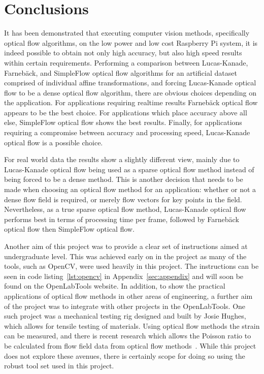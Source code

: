 \chapter{Conclusions}
\label{sec:conclusions}

\ifpdf
    \graphicspath{{Section5/Figs/Raster/}{Section5/Figs/PDF/}{Section5/Figs/}}
\else
    \graphicspath{{Section5/Figs/Vector/}{Section5/Figs/}}
\fi

It has been demonstrated that executing computer vision methods, specifically optical flow algorithms, on the low power and low cost Raspberry Pi system, it is indeed possible to obtain not only high accuracy, but also high speed results within certain requirements. Performing a comparison between Lucas-Kanade, Farnebäck, and SimpleFlow optical flow algorithms for an artificial dataset comprised of individual affine transformations, and forcing Lucas-Kanade optical flow to be a dense optical flow algorithm, there are obvious choices depending on the application. For applications requiring realtime results Farnebäck optical flow appears to be the best choice. For applications which place accuracy above all else, SimpleFlow optical flow shows the best results. Finally, for applications requiring a compromise between accuracy and processing speed, Lucas-Kanade optical flow is a possible choice.

For real world data the results show a slightly different view, mainly due to Lucas-Kanade optical flow being used as a sparse optical flow method instead of being forced to be a dense method. This is another decision that needs to be made when choosing an optical flow method for an application: whether or not a dense flow field is required, or merely flow vectors for key points in the field. Nevertheless, as a true sparse optical flow method, Lucas-Kanade optical flow performs best in terms of processing time per frame, followed by Farnebäck optical flow then SimpleFlow optical flow.

Another aim of this project was to provide a clear set of instructions aimed at undergraduate level. This was achieved early on in the project as many of the tools, such as OpenCV, were used heavily in this project. The instructions can be seen in code listing~\ref{lst:opencv} in Appendix~\ref{sec:appendix} and will soon be found on the OpenLabTools website. In addition, to show the practical applications of optical flow methods in other areas of engineering, a further aim of the project was to integrate with other projects in the OpenLabTools. One such project was a mechanical testing rig designed and built by Josie Hughes, which allows for tensile testing of materials. Using optical flow methods the strain can be measured, and there is recent research which allows the Poisson ratio to be calculated from flow field data from optical flow methods~\cite{chen2013new}. While this project does not explore these avenues, there is certainly scope for doing so using the robust tool set used in this project.

